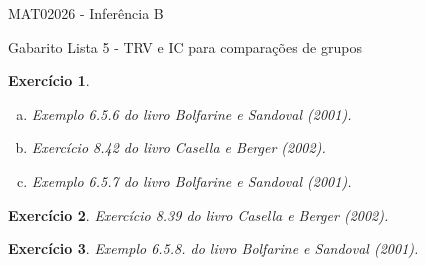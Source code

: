 \documentclass[letter,11pt]{article}
\newtheorem{exer}{Exercício}
\begin{document}
\begin{center}{ \Large MAT02026 - Inferência B }\end{center}

\begin{center}
{\large  \sc Gabarito Lista 5 - TRV e IC para comparações de grupos}
\end{center}
\vspace{5mm}

\begin{exer} \rm
\begin{enumerate}[a)]
  \item %
  Exemplo 6.5.6 do livro Bolfarine e Sandoval (2001). 
  
  \item %
  Exercício 8.42 do livro Casella e Berger (2002).
  
  
  \item %
  Exemplo 6.5.7 do livro Bolfarine e Sandoval (2001).
\end{enumerate}
\end{exer}


\begin{exer} \rm
Exercício 8.39 do livro Casella e Berger (2002).
\end{exer}


\begin{exer} \rm
Exemplo 6.5.8. do livro Bolfarine e Sandoval (2001).
\end{exer}
\end{document}
